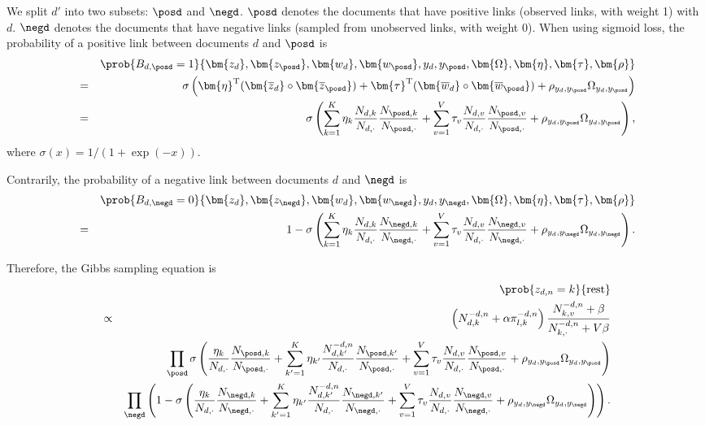 We split $d'$ into two subsets: $\posd$ and $\negd$. $\posd$ denotes the documents that have positive links (observed links, with weight 1) with $d$. $\negd$ denotes the documents that have negative links (sampled from unobserved links, with weight 0). When using sigmoid loss, the probability of a positive link between documents $d$ and $\posd$ is
\begin{eqnarray}
&&\prob {B_{d,\posd}=1} {\bm{z_d}, \bm{z_{\posd}}, \bm{w_d}, \bm{w_{\posd}}, y_d, y_{\posd}, \bm{\Omega}, \bm{\eta}, \bm{\tau}, \bm{\rho}}\\
&=& \sigma \left( \bm{\eta}^\mathrm{T} (\bm{\overline{z}_d} \circ \bm{\overline{z}_{\posd}}) + \bm{\tau}^\mathrm{T} (\bm{\overline{w}_d} \circ \bm{\overline{w}_{\posd}}) + \rho_{y_d, y_{\posd}} \Omega_{y_d,y_{\posd}} \right)\\
&=& \sigma \left( \sum_{k=1}^{K} \eta_k \frac {N_{d,k}} {N_{d,\cdot}} \frac {N_{\posd,k}} {N_{\posd,\cdot}} + \sum_{v=1}^{V} \tau_v \frac {N_{d,v}} {N_{d,\cdot}} \frac {N_{\posd,v}} {N_{\posd,\cdot}} + \rho_{y_d, y_{\posd}} \Omega_{y_d,y_{\posd}} \right),
\end{eqnarray}
where $\sigma(x) = 1/ (1+\exp(-x))$.

Contrarily, the probability of a negative link between documents $d$ and $\negd$ is
\begin{eqnarray}
&&\prob {B_{d,\negd}=0} {\bm{z_d}, \bm{z_{\negd}}, \bm{w_d}, \bm{w_{\negd}}, y_d, y_{\negd}, \bm{\Omega}, \bm{\eta}, \bm{\tau}, \bm{\rho}}\\
&=& 1 - \sigma \left( \sum_{k=1}^{K} \eta_k \frac {N_{d,k}} {N_{d,\cdot}} \frac {N_{\negd,k}} {N_{\negd,\cdot}} + \sum_{v=1}^{V} \tau_v \frac {N_{d,v}} {N_{d,\cdot}} \frac {N_{\negd,v}} {N_{\negd,\cdot}} + \rho_{y_d, y_{\negd}} \Omega_{y_d,y_{\negd}} \right).
\end{eqnarray}

Therefore, the Gibbs sampling equation is
\begin{eqnarray}
&&\prob {z_{d,n}=k} {\mathrm{rest}}\\
&\propto& \left( N_{d,k}^{-d,n} + \alpha \pi_{l,k}^{-d,n} \right) \frac {N_{k,v}^{-d,n}+\beta} {N_{k,\cdot}^{-d,n}+V\beta} \notag\\
&&\prod_{\posd} \sigma \left( \frac {\eta_k} {N_{d,\cdot}} \frac {N_{\posd,k}} {N_{\posd,\cdot}} + \sum_{k'=1}^{K} \eta_{k'} \frac {N_{d,k'}^{-d,n}} {N_{d,\cdot}} \frac {N_{\posd,k'}} {N_{\posd,\cdot}} + \sum_{v=1}^{V} \tau_v \frac {N_{d,v}} {N_{d,\cdot}} \frac {N_{\posd,v}} {N_{\posd,\cdot}} + \rho_{y_d, y_{\posd}} \Omega_{y_d,y_{\posd}} \right) \label{eq:sigmoid_topic}\\
&&\prod_{\negd} \left( 1 - \sigma \left( \frac {\eta_k} {N_{d,\cdot}} \frac {N_{\negd,k}} {N_{\negd,\cdot}} + \sum_{k'=1}^{K} \eta_{k'} \frac {N_{d,k'}^{-d,n}} {N_{d,\cdot}} \frac {N_{\negd,k'}} {N_{\negd,\cdot}} + \sum_{v=1}^{V} \tau_v \frac {N_{d,v}} {N_{d,\cdot}} \frac {N_{\negd,v}} {N_{\negd,\cdot}} + \rho_{y_d, y_{\negd}} \Omega_{y_d,y_{\negd}} \right) \right). \notag
\end{eqnarray}

